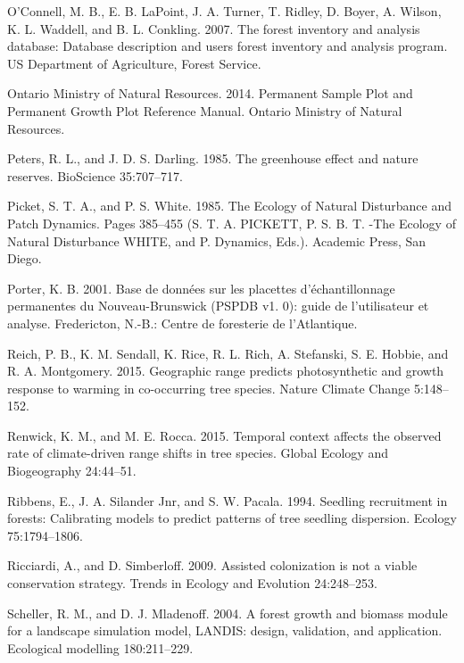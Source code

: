 \documentclass[12pt]{article}
\newlength{\cslhangindent}
\newenvironment{cslreferences}%
  {\setlength{\parindent}{0pt}%
  \everypar{\setlength{\hangindent}{\cslhangindent}}\ignorespaces}%
  {\par}
\begin{document}
\begin{cslreferences}
\leavevmode\hypertarget{ref-OConnell2007}{}%
O'Connell, M. B., E. B. LaPoint, J. A. Turner, T. Ridley, D. Boyer, A.
Wilson, K. L. Waddell, and B. L. Conkling. 2007. The forest inventory
and analysis database: Database description and users forest inventory
and analysis program. US Department of Agriculture, Forest Service.

\leavevmode\hypertarget{ref-OMNR2014}{}%
Ontario Ministry of Natural Resources. 2014. Permanent Sample Plot and
Permanent Growth Plot Reference Manual. Ontario Ministry of Natural
Resources.

\leavevmode\hypertarget{ref-Peters1985a}{}%
Peters, R. L., and J. D. S. Darling. 1985. The greenhouse effect and
nature reserves. BioScience 35:707--717.

\leavevmode\hypertarget{ref-PICKETT1985}{}%
Picket, S. T. A., and P. S. White. 1985. The Ecology of Natural
Disturbance and Patch Dynamics. Pages 385--455 (S. T. A. PICKETT, P. S.
B. T. -The Ecology of Natural Disturbance WHITE, and P. Dynamics, Eds.).
Academic Press, San Diego.

\leavevmode\hypertarget{ref-Porter2001}{}%
Porter, K. B. 2001. Base de données sur les placettes d'échantillonnage
permanentes du Nouveau-Brunswick (PSPDB v1. 0): guide de l'utilisateur
et analyse. Fredericton, N.-B.: Centre de foresterie de l'Atlantique.

\leavevmode\hypertarget{ref-Reich2015}{}%
Reich, P. B., K. M. Sendall, K. Rice, R. L. Rich, A. Stefanski, S. E.
Hobbie, and R. A. Montgomery. 2015. Geographic range predicts
photosynthetic and growth response to warming in co-occurring tree
species. Nature Climate Change 5:148--152.

\leavevmode\hypertarget{ref-Renwick2015}{}%
Renwick, K. M., and M. E. Rocca. 2015. Temporal context affects the
observed rate of climate-driven range shifts in tree species. Global
Ecology and Biogeography 24:44--51.

\leavevmode\hypertarget{ref-Ribbens1994}{}%
Ribbens, E., J. A. Silander Jnr, and S. W. Pacala. 1994. Seedling
recruitment in forests: Calibrating models to predict patterns of tree
seedling dispersion. Ecology 75:1794--1806.

\leavevmode\hypertarget{ref-Ricciardi2009}{}%
Ricciardi, A., and D. Simberloff. 2009. Assisted colonization is not a
viable conservation strategy. Trends in Ecology and Evolution
24:248--253.

\leavevmode\hypertarget{ref-Scheller2004}{}%
Scheller, R. M., and D. J. Mladenoff. 2004. A forest growth and biomass
module for a landscape simulation model, LANDIS: design, validation, and
application. Ecological modelling 180:211--229.


\end{cslreferences}
\end{document}
